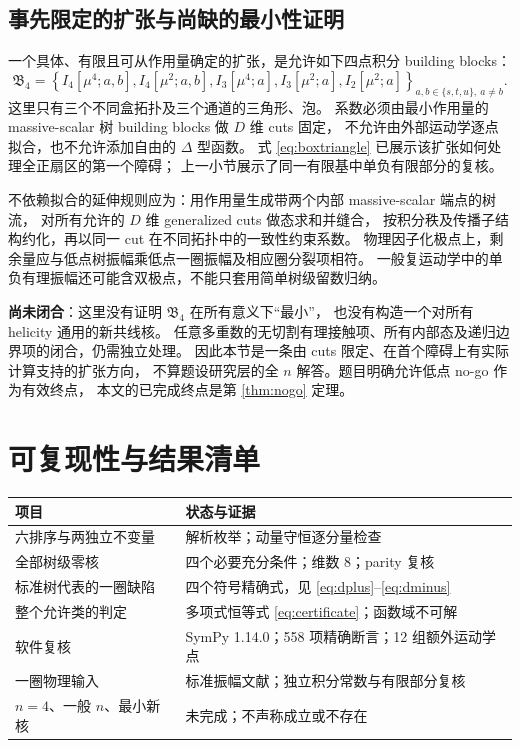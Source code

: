 \documentclass[UTF8,a4paper,11pt,fontset=fandol]{ctexart}
\newcommand{\openpart}{\textbf{尚未闭合}}
\begin{document}
\subsection{事先限定的扩张与尚缺的最小性证明}
一个具体、有限且可从作用量确定的扩张，是允许如下四点积分 building blocks：
\begin{equation}
 \mathfrak B_4=\left\{
 I_4[\mu^4;a,b],I_4[\mu^2;a,b],
 I_3[\mu^4;a],I_3[\mu^2;a],I_2[\mu^2;a]
 \right\}_{a,b\in\{s,t,u\},\ a\ne b}.
\end{equation}
这里只有三个不同盒拓扑及三个通道的三角形、泡。
系数必须由最小作用量的 massive-scalar 树 building blocks 做 $D$ 维 cuts 固定，
不允许由外部运动学逐点拟合，也不允许添加自由的 $\Delta$ 型函数。
式 \eqref{eq:boxtriangle} 已展示该扩张如何处理全正扇区的第一个障碍；
上一小节展示了同一有限基中单负有限部分的复核。

不依赖拟合的延伸规则应为：用作用量生成带两个内部 massive-scalar 端点的树流，
对所有允许的 $D$ 维 generalized cuts 做态求和并缝合，
按积分秩及传播子结构约化，再以同一 cut 在不同拓扑中的一致性约束系数。
物理因子化极点上，剩余量应与低点树振幅乘低点一圈振幅及相应圈分裂项相符。
一般复运动学中的单负有理振幅还可能含双极点，不能只套用简单树级留数归纳。

\openpart：这里没有证明 $\mathfrak B_4$ 在所有意义下“最小”，
也没有构造一个对所有 helicity 通用的新共线核。
任意多重数的无切割有理接触项、所有内部态及递归边界项的闭合，仍需独立处理。
因此本节是一条由 cuts 限定、在首个障碍上有实际计算支持的扩张方向，
不算题设研究层的全 $n$ 解答。题目明确允许低点 no-go 作为有效终点，
本文的已完成终点是第 \ref{thm:nogo} 定理。

\section{可复现性与结果清单}
\begin{center}
\begin{tabular}{p{}p{}}
\toprule
项目&状态与证据\\\midrule
六排序与两独立不变量&解析枚举；动量守恒逐分量检查\\
全部树级零核&四个必要充分条件；维数 $8$；parity 复核\\
标准树代表的一圈缺陷&四个符号精确式，见 \eqref{eq:dplus}--\eqref{eq:dminus}\\
整个允许类的判定&多项式恒等式 \eqref{eq:certificate}；函数域不可解\\
软件复核&SymPy 1.14.0；558 项精确断言；12 组额外运动学点\\
一圈物理输入&标准振幅文献；独立积分常数与有限部分复核\\
$n=4$、一般 $n$、最小新核&未完成；不声称成立或不存在\\\bottomrule
\end{tabular}
\end{center}
\end{document}
